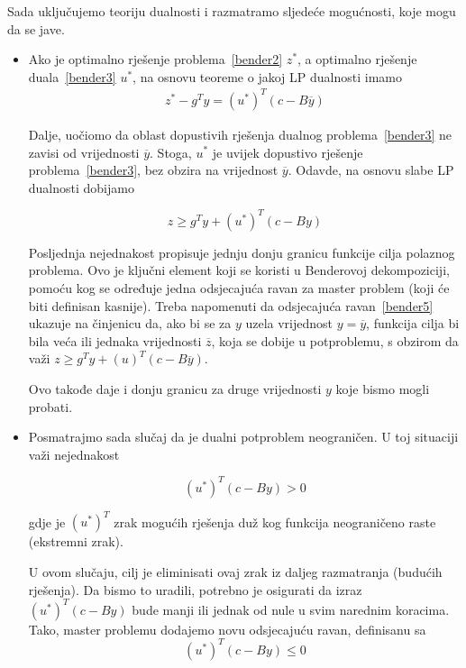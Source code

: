 \documentclass[a4paper, utf8, 11pt, colorlinks]{book}
\begin{document}
Sada uključujemo teoriju dualnosti i razmatramo sljedeće mogućnosti, koje mogu da se jave.
\begin{itemize}
\item Ako je optimalno rješenje problema~\ref{bender2} $z^*$, a optimalno rješenje duala~\ref{bender3} $u^*$, na osnovu teoreme o jakoj LP dualnosti imamo
  \begin{equation}
	\begin{aligned}\label{bender4}
z^*-g^Ty=(u^*)^T(c-B\overline{y})
	\end{aligned}
\end{equation}


Dalje, uočiomo da oblast dopustivih rješenja dualnog problema~\ref{bender3} ne zavisi od vrijednosti $\overline{y}$. Stoga, $u^*$ je uvijek dopustivo rješenje problema~\ref{bender3}, bez obzira na vrijednost $\overline{y}$. Odavde, na osnovu slabe LP dualnosti dobijamo

  \begin{equation}
\label{bender5}
		z\geqslant g^Ty+(u^*)^T(c-By)
\end{equation}


Posljednja nejednakost propisuje jednju donju granicu funkcije cilja polaznog problema. Ovo je ključni element koji se koristi u Benderovoj dekompoziciji, pomoću kog se određuje jedna odsjecajuća ravan za master problem (koji će biti definisan kasnije). Treba napomenuti da odsjecajuća ravan~\ref{bender5} ukazuje na činjenicu da, ako bi se za $y$ uzela vrijednost $y=\overline{y}$, funkcija cilja bi bila veća ili jednaka vrijednosti $\overline{z}$, koja se dobije u potproblemu, s obzirom da važi $	z\geqslant g^Ty+(u)^T(c-B\overline{y})$.

Ovo takođe daje i donju granicu za druge vrijednosti $y$ koje bismo mogli probati.

\item Posmatrajmo sada slučaj da je dualni potproblem neograničen. U toj situaciji važi nejednakost


\begin{equation}
	\label{bender6}
	(u^*)^T(c-By)>0
\end{equation}

gdje je ${(u^*)}^T$ zrak mogućih rješenja duž kog funkcija neograničeno raste (ekstremni zrak).

U ovom slučaju, cilj je eliminisati ovaj zrak iz daljeg razmatranja (budućih rješenja). Da bismo to uradili, potrebno je osigurati da izraz $(u^*)^T(c-By)$ bude manji ili jednak od nule u svim narednim koracima. Tako, master problemu dodajemo novu odsjecajuću ravan, definisanu sa
\begin{equation}
	\label{bender7}
	(u^*)^T(c-By)\leqslant 0
\end{equation}

\end{itemize}
 
\end{document}
